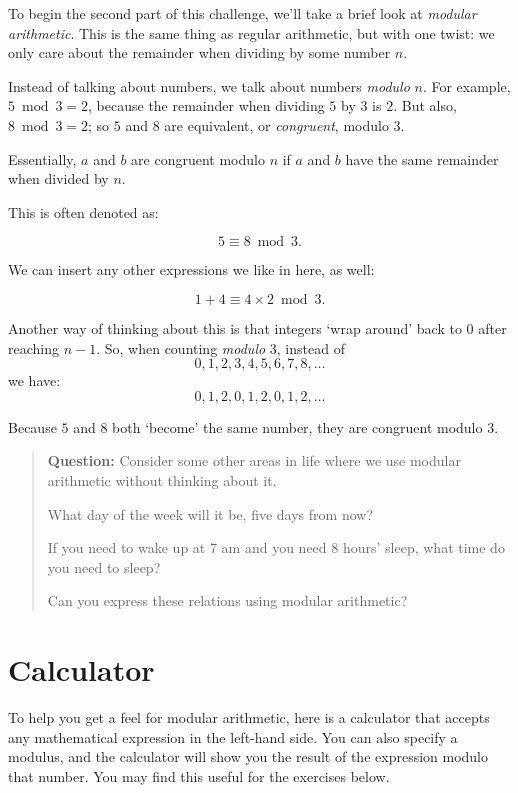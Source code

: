 \documentclass[
  letterpaper,
  DIV=11,
  numbers=noendperiod]{scrreprt}
\begin{document}
To begin the second part of this challenge, we'll take a brief look at
\emph{modular arithmetic}. This is the same thing as regular arithmetic,
but with one twist: we only care about the remainder when dividing by
some number \(n\).

Instead of talking about numbers, we talk about numbers \emph{modulo}
\(n\). For example, \(5 \bmod 3 = 2\), because the remainder when
dividing \(5\) by \(3\) is \(2\). But also, \(8 \bmod 3 = 2\); so \(5\)
and \(8\) are equivalent, or \emph{congruent}, modulo \(3\).

Essentially, \(a\) and \(b\) are congruent modulo \(n\) if \(a\) and
\(b\) have the same remainder when divided by \(n\).

This is often denoted as:

\[5 \equiv 8 \bmod 3.\]

We can insert any other expressions we like in here, as well:

\[1 + 4 \equiv 4 \times 2 \bmod 3.\]

Another way of thinking about this is that integers `wrap around' back
to 0 after reaching \(n - 1\). So, when counting \emph{modulo} \(3\),
instead of \[0, 1, 2, 3, 4, 5, 6, 7, 8, \ldots\] we have:
\[0, 1, 2, 0, 1, 2, 0, 1, 2, \ldots\]

Because \(5\) and \(8\) both `become' the same number, they are
congruent modulo \(3\).

\begin{quote}
\textbf{Question:} Consider some other areas in life where we use
modular arithmetic without thinking about it.

What day of the week will it be, five days from now?

If you need to wake up at 7 am and you need 8 hours' sleep, what time do
you need to sleep?

Can you express these relations using modular arithmetic?
\end{quote}

\hypertarget{calculator}{%
\section{Calculator}\label{calculator}}

To help you get a feel for modular arithmetic, here is a calculator that
accepts any mathematical expression in the left-hand side. You can also
specify a modulus, and the calculator will show you the result of the
expression modulo that number. You may find this useful for the
exercises below.
\end{document}
